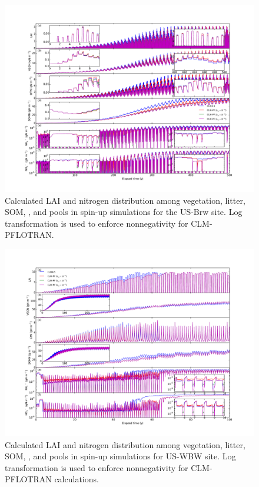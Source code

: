 \documentclass[gmd, manuscript]{copernicus}
\begin{document}
\begin{figure}[t]
\includegraphics[width=1.0\textwidth]{../figs/fig10/brw500yl.pdf}
\caption{Calculated LAI and nitrogen distribution among vegetation, litter,
SOM, , and  pools in spin-up simulations for the US-Brw
site. Log transformation is used to enforce nonnegativity for CLM-PFLOTRAN.}
\label{fig:brw500yl}
\end{figure}

\begin{figure}[t]
\includegraphics[width=1.0\textwidth]{../figs/fig11/pit300yl.pdf}
\caption{Calculated LAI and nitrogen distribution among vegetation, litter,
SOM, , and  pools in spin-up simulations for US-WBW
site. Log transformation is used to enforce nonnegativity for CLM-PFLOTRAN
calculations.}
\label{fig:pit300yl}
\end{figure}
\end{document}
